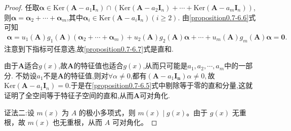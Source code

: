 \documentclass[../../main.tex]{subfiles}
\begin{document}
\begin{proof}
任取\(\boldsymbol{\alpha}\in \mathrm{Ker}(\boldsymbol{A}-a_1\boldsymbol{I}_n)\cap(\mathrm{Ker}(\boldsymbol{A}-a_2\boldsymbol{I}_n)+\cdots+\mathrm{Ker}(\boldsymbol{A}-a_m\boldsymbol{I}_n))\), 则\(\boldsymbol{\alpha} = \boldsymbol{\alpha}_2+\cdots+\boldsymbol{\alpha}_m\),其中\(\boldsymbol{\alpha}_i\in \mathrm{Ker}(\boldsymbol{A} - a_i\boldsymbol{I}_n)(i\geq 2)\). 由\eqref{proposition0.7-6.6}式可知
\begin{align*}
\boldsymbol{\alpha} = u_1(\boldsymbol{A})g_1(\boldsymbol{A})(\boldsymbol{\alpha}_2 + \cdots + \boldsymbol{\alpha}_m) + u_2(\boldsymbol{A})g_2(\boldsymbol{A})\boldsymbol{\alpha} + \cdots + u_m(\boldsymbol{A})g_m(\boldsymbol{A})\boldsymbol{\alpha} = \boldsymbol{0}.
\end{align*}
注意到下指标可任意选,故\eqref{proposition0.7-6.7}式是直和.

由于\(\boldsymbol{A}\)适合\(g(x)\),故\(\boldsymbol{A}\)的特征值也适合\(g(x)\),从而只可能是\(a_1,a_2,\cdots,a_m\)中的一部分. 
不妨设$a_1$不是$\boldsymbol{A}$的特征值,则对$\forall \alpha\ne 0$,都有$(\boldsymbol{A}-a_1\boldsymbol{I_n})\alpha \ne 0,$故$\mathrm{Ker}(\boldsymbol{A} - a_1\boldsymbol{I}_n)=0$.于是在\eqref{proposition0.7-6.5}式中剔除等于零的直和分量,这就证明了全空间等于特征子空间的直和,从而\(\boldsymbol{A}\)可对角化.

{\color{blue}证法二:}设 $m(x)$ 为 $A$ 的极小多项式，则 $m(x)\mid g(x)$。由于 $g(x)$ 无重根，故 $m(x)$ 也无重根，从而 $A$ 可对角化。
\end{proof}
\end{document}
